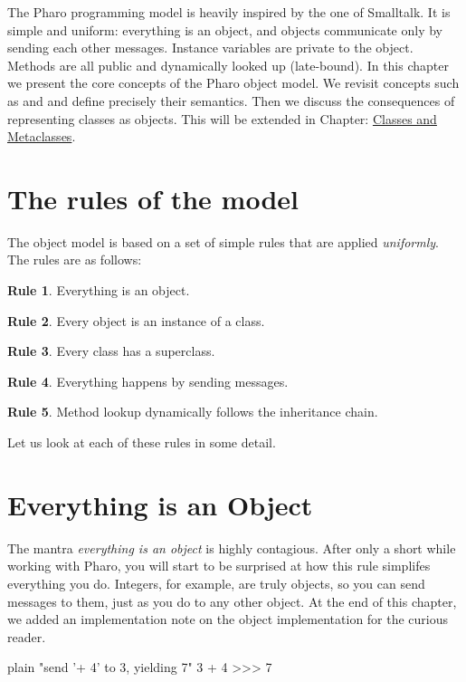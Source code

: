 \documentclass[10pt,twoside,english]{_support/latex/sbabook/sbabook}
\begin{document}
\frontmatter
\pagestyle{plain}

\tableofcontents*
\clearpage\listoffigures

\mainmatter

\label{cha:model}
The Pharo programming model is heavily inspired by the one of Smalltalk. It is
simple and uniform: everything is an object, and objects communicate only by
sending each other messages. Instance variables are private to the object.
Methods are all public and dynamically looked up (late-bound). In this chapter
we present the core concepts of the Pharo object model. We revisit concepts such
as  and  and define precisely their semantics. Then we discuss
the consequences of representing classes as objects. This will be extended in
Chapter:
\hyperref[cha:metaclasses]{Classes and Metaclasses}.
\chapter{The rules of the model}\label{sec:rules}
The object model is based on a set of simple rules that are applied
\textit{uniformly}. The rules are as follows:

\textbf{Rule 1}. Everything is an object.

\textbf{Rule 2}. Every object is an instance of a class.

\textbf{Rule 3}. Every class has a superclass.

\textbf{Rule 4}. Everything happens by sending messages.

\textbf{Rule 5}. Method lookup dynamically follows the inheritance chain.

Let us look at each of these rules in some detail.
\chapter{Everything is an Object}
The mantra \textit{everything is an object} is highly contagious. After only a short
while working with Pharo, you will start to be surprised at how this rule
simplifes everything you do. Integers, for example, are truly objects, so you
can send messages to them, just as you do to any other object. At the end of
this chapter, we added an implementation note on the object implementation for
the curious reader.

\begin{displaycode}{plain}
"send '+ 4' to 3, yielding 7"
3 + 4
>>> 7
\end{displaycode}
\end{document}
